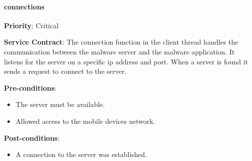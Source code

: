 		\paragraph{connections}
			\begin{description}
			    \item{\textbf{Priority}:} Critical%
			    \item{\textbf{Service Contract}:} The connection function in the client thread handles the communication between the malware server and the malware application. It listens for the server on a specific ip address and port. When a server is found it sends a request to connect to the server.
			    \item{\textbf{Pre-conditions}:}%
    			    \begin{itemize}
    			        \item The server must be available.
    			        \item Allowed access to the mobile devices network.
    			    \end{itemize}
			    \item{\textbf{Post-conditions}:} %
    			    \begin{itemize}
    			    \item A connection to the server was established.
    			    \end{itemize}
			\end{description}